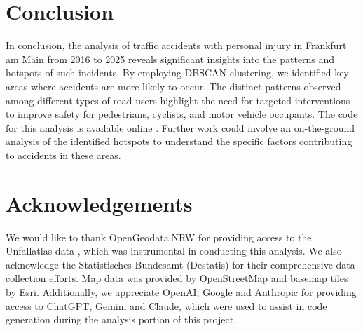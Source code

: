 \documentclass[10pt,a4paper]{article} %
\begin{document}
\section*{Conclusion}
In conclusion, the analysis of traffic accidents with personal injury in Frankfurt am Main from 2016 to 2025 reveals significant insights into the patterns and hotspots of such incidents. By employing DBSCAN clustering, we identified key areas where accidents are more likely to occur. The distinct patterns observed among different types of road users highlight the need for targeted interventions to improve safety for pedestrians, cyclists, and motor vehicle occupants. The code for this analysis is available online \cite{github2025}. Further work could involve an on-the-ground analysis of the identified hotspots to understand the specific factors contributing to accidents in these areas.

\section*{Acknowledgements}
We would like to thank OpenGeodata.NRW for providing access to the Unfallatlas data \cite{opengeodatanrw}, which was instrumental in conducting this analysis. We also acknowledge the Statistisches Bundesamt (Destatis) for their comprehensive data collection efforts. Map data was provided by OpenStreetMap \cite{openstreetmap} and basemap tiles by Esri. Additionally, we appreciate OpenAI, Google and Anthropic for providing access to ChatGPT, Gemini and Claude, which were used to assist in code generation during the analysis portion of this project.

\newpage

\nocite{dldeby20,destatis12411}


\end{document}
